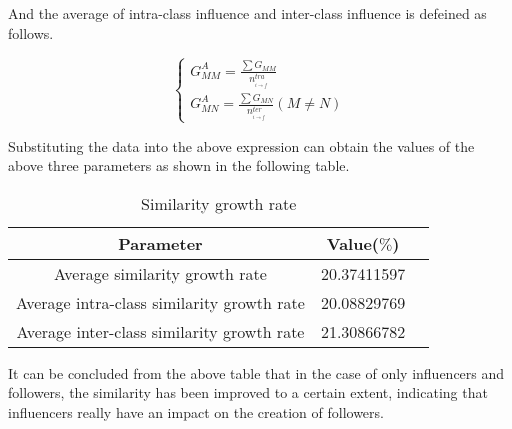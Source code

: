 \documentclass{mcmthesis}
\begin{document}
And the average of intra-class influence and inter-class influence is defeined as follows.
\begin{spacing}{1.2}
\large
\begin{equation}
\left\{ \begin{array}{l}
G_{MM}^A = \frac{{\sum {{G_{MM}}} }}{{n_{_{i \to f}}^{tra}}}\\
G_{MN}^A = \frac{{\sum {{G_{MN}}} }}{{n_{_{i \to f}}^{ter}}}(M \ne N)
\end{array} \right.
\end{equation}
\end{spacing}
Substituting the data into the above expression can obtain the values of the above three parameters as shown in the following table.
\begin{table}[H]
	\centering  
	\caption{Similarity growth rate}
	
	\label{table_time}
	
	\begin{tabular}{ccc}  
		
		\toprule   
		
		Parameter&Value($\%$) \\ 
		
		\midrule   
		Average similarity growth rate&20.37411597
		\\
		Average intra-class similarity growth rate &20.08829769
		\\  
		
		Average inter-class similarity growth rate& 21.30866782
		\\  
		
		\bottomrule  
		
	\end{tabular}
\end{table}
It can be concluded from the above table that in the case of only influencers and followers, the similarity has been improved to a certain extent, indicating that influencers really have an impact on the creation of followers.
\end{document}
